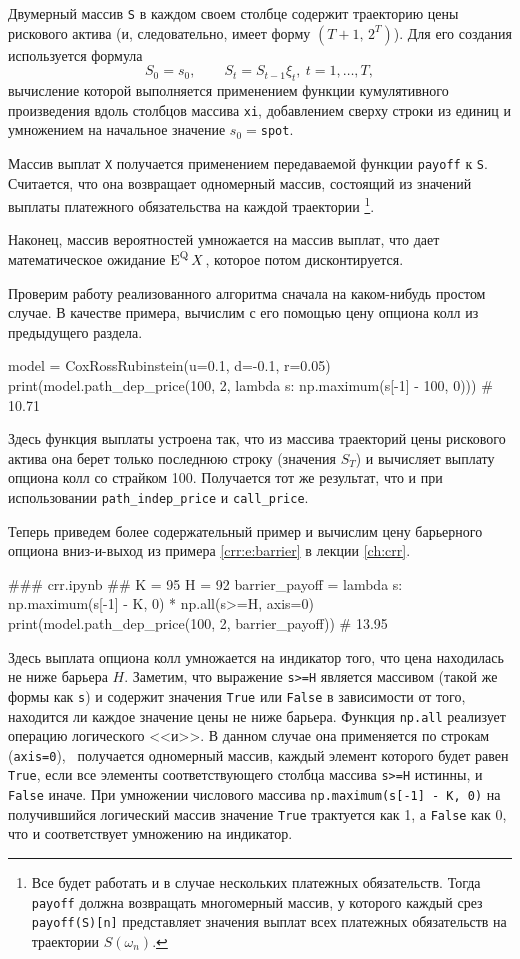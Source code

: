 Двумерный массив \verb"S" в каждом своем столбце содержит траекторию цены рискового актива (и, следовательно, имеет форму $(T+1,\, 2^T)$).
Для его создания используется формула
\[
S_0 = s_0, \qquad S_t = S_{t-1}\xi_t,\ t=1,\dots,T,
\]
вычисление которой выполняется применением функции кумулятивного произведения вдоль столбцов массива \verb"xi", добавлением сверху строки из единиц и умножением на начальное значение $s_0=$\;\verb"spot". 

Массив выплат \verb"X" получается применением передаваемой функции \verb"payoff" к \verb"S". Считается, что она возвращает одномерный массив, состоящий из значений выплаты платежного обязательства на каждой траектории%
\footnote{Все будет работать и в случае нескольких платежных обязательств.
Тогда \verb"payoff" должна возвращать многомерный массив, у которого каждый срез \verb"payoff(S)[n]" представляет значения выплат всех платежных обязательств на траектории $S(\omega_n)$.}.

Наконец, массив вероятностей умножается на массив выплат, что дает математическое ожидание $\operatorname{E}^{\mathrm{Q}} X$, которое потом дисконтируется.

Проверим работу реализованного алгоритма сначала на каком-нибудь простом случае.
В качестве примера, вычислим с его помощью цену опциона колл из предыдущего раздела.
\begin{python}
model = CoxRossRubinstein(u=0.1, d=-0.1, r=0.05)
print(model.path_dep_price(100, 2, lambda s: np.maximum(s[-1] - 100, 0))) # 10.71
\end{python}
Здесь функция выплаты устроена так, что из массива траекторий цены рискового актива она берет только последнюю строку (значения $S_T$) и вычисляет выплату опциона колл со страйком 100.
Получается тот же результат, что и при использовании \verb"path_indep_price" и \verb"call_price".

Теперь приведем более содержательный пример и вычислим цену барьерного опциона вниз-и-выход из примера \ref{crr:e:barrier} в лекции \ref{ch:crr}.
\begin{python}
### crr.ipynb ##
K = 95
H = 92
barrier_payoff = lambda s: np.maximum(s[-1] - K, 0) * np.all(s>=H, axis=0)
print(model.path_dep_price(100, 2, barrier_payoff))  # 13.95
\end{python}
Здесь выплата опциона колл умножается на индикатор того, что цена находилась не ниже барьера $H$.
Заметим, что выражение \verb"s>=H" является массивом (такой же формы как \verb"s") и содержит значения \verb"True" или \verb"False" в зависимости от того, находится ли каждое значение цены не ниже барьера.
Функция \verb"np.all" реализует операцию логического <<и>>.
В данном случае она применяется по строкам (\verb"axis=0"), \te\ получается одномерный массив, каждый элемент которого будет равен \verb"True", если все элементы соответствующего столбца массива \verb"s>=H" истинны, и \verb"False" иначе.
При умножении числового массива \verb"np.maximum(s[-1] - K, 0)" на получившийся логический массив значение \verb"True" трактуется как 1, а \verb"False" как 0, что и соответствует умножению на индикатор.

